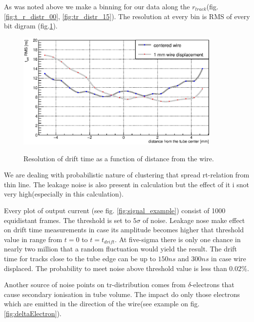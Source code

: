 \documentclass[]{article}
\begin{document}
	As was noted above we make a binning  for our data along the $r_{track}$(fig. \ref{fig:t_r_distr_00}, \ref{fig:tr_distr_15}). The resolution at every bin  is RMS of every bit digram (fig.\ref{fig:driftTimeResolutionEvo}).
	
	\begin{figure}[h!]
		\centering
		\includegraphics[width=0.9\textwidth]{DTimeRMS2}
		\label{fig:driftTimeResolutionEvo}
		\caption{Resolution of drift time as a function of distance from the wire.}
	\end{figure}
	
	We are dealing with probabilistic  nature of clustering that spread rt-relation from thin line. The leakage noise is also present in calculation but the effect of it i snot very high(especially in this calculation).
	
	Every plot of output current (see fig. \ref{fig:signal_example}) consist of 1000 equidistant frames. The threshold is set to $5\sigma$ of noise. Leakage nose make effect on drift time measurements in case its amplitude becomes higher that threshold value in range from $t=0$ to $t= t_{drift}$. At five-sigma there is only one chance in nearly two million that a random fluctuation would yield the result. The drift time for tracks close to the tube edge can be up to $150 ns$ and $300 ns$ in case wire displaced. The probability to meet noise above threshold value is less than $0.02\%$.
	
	Another source of noise points on tr-distribution comes from $\delta$-electrons that cause secondary ionisation in tube volume. The impact do only those electrons which are emitted in the direction of the wire(see example on fig.\ref{fig:deltaElectron}).
	
\end{document}
